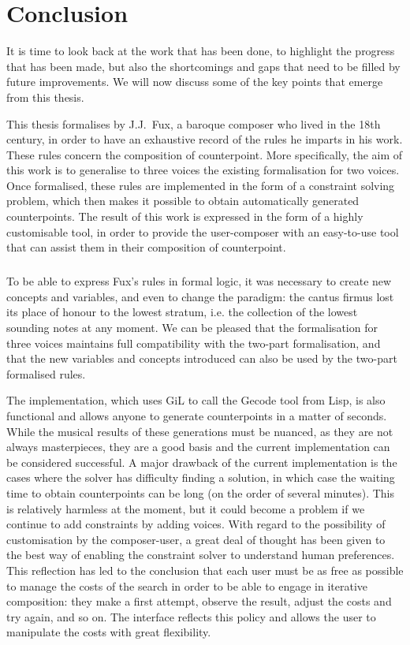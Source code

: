 \chapter*{Conclusion}\label{chapter:Conclusion}
It is time to look back at the work that has been done, to highlight the progress that has been made, but also the shortcomings and gaps that need to be filled by future improvements. We will now discuss some of the key points that emerge from this thesis.

This thesis formalises \gaps by J.J.~Fux, a baroque composer who lived in the 18th century, in order to have an exhaustive record of the rules he imparts in his work. These rules concern the composition of counterpoint. More specifically, the aim of this work is to generalise to three voices the existing formalisation for two voices. Once formalised, these rules are implemented in the form of a constraint solving problem, which then makes it possible to obtain automatically generated counterpoints. The result of this work is expressed in the form of a highly customisable tool, in order to provide the user-composer with an easy-to-use tool that can assist them in their composition of counterpoint. 

\paragraph{}
To be able to express Fux's rules in formal logic, it was necessary to create new concepts and variables, and even to change the paradigm: the cantus firmus lost its place of honour to the lowest stratum, i.e. the collection of the lowest sounding notes at any moment. We can be pleased that the formalisation for three voices maintains full compatibility with the two-part formalisation, and that the new variables and concepts introduced can also be used by the two-part formalised rules.


The implementation, which uses GiL to call the Gecode tool from Lisp, is also functional and allows anyone to generate counterpoints in a matter of seconds. While the musical results of these generations must be nuanced, as they are not always masterpieces, they are a good basis and the current implementation can be considered successful. A major drawback of the current implementation is the cases where the solver has difficulty finding a solution, in which case the waiting time to obtain counterpoints can be long (on the order of several minutes). This is relatively harmless at the moment, but it could become a problem if we continue to add constraints by adding voices.
With regard to the possibility of customisation by the composer-user, a great deal of thought has been given to the best way of enabling the constraint solver to understand human preferences. This reflection has led to the conclusion that each user must be as free as possible to manage the costs of the search in order to be able to engage in iterative composition: they make a first attempt, observe the result, adjust the costs and try again, and so on. The interface reflects this policy and allows the user to manipulate the costs with great flexibility. 

